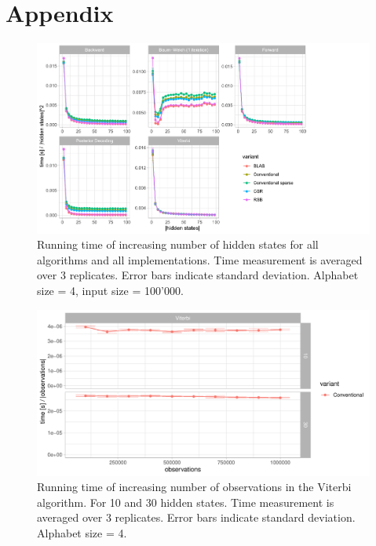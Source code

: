\appendix
\section{Appendix}

\begin{figure}[H]
    \centering
  \includegraphics[scale=0.85]{figures/figure_C3_scaled.pdf}
    \caption{Running time of increasing number of hidden states for all algorithms and all implementations. Time measurement is averaged over 3 replicates. Error bars indicate standard deviation. Alphabet size = 4, input size = 100'000.}
    \label{app:hiddenstates}
\end{figure}




\begin{figure}[H]
    \centering
    \includegraphics[scale=0.85]{figures/figure_A3_scaled.pdf}
    \caption{Running time of increasing number of observations in the Viterbi algorithm. For 10 and 30 hidden states. Time measurement is averaged over 3 replicates. Error bars indicate standard deviation. Alphabet size = 4. }
    \label{app:viterbi}
\end{figure}